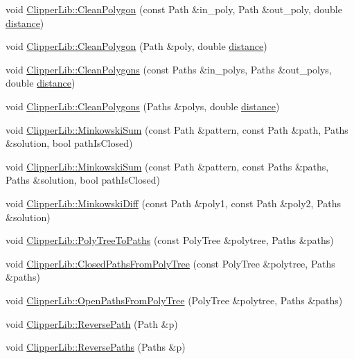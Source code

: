 \begin{DoxyCompactItemize}
\item 
void \mbox{\hyperlink{namespace_clipper_lib_a9246a3146ac112581e82be58e158be7b}{Clipper\+Lib\+::\+Clean\+Polygon}} (const Path \&in\+\_\+poly, Path \&out\+\_\+poly, double \mbox{\hyperlink{unwrapping_8cc_ac6bcc6db62057bda0b6195a11578fdfa}{distance}})
\item 
void \mbox{\hyperlink{namespace_clipper_lib_a819f3ac34feed7ca8c64c54bc534eb1b}{Clipper\+Lib\+::\+Clean\+Polygon}} (Path \&poly, double \mbox{\hyperlink{unwrapping_8cc_ac6bcc6db62057bda0b6195a11578fdfa}{distance}})
\item 
void \mbox{\hyperlink{namespace_clipper_lib_a770cbc6ce4f16d02b8fe27c5abf6159c}{Clipper\+Lib\+::\+Clean\+Polygons}} (const Paths \&in\+\_\+polys, Paths \&out\+\_\+polys, double \mbox{\hyperlink{unwrapping_8cc_ac6bcc6db62057bda0b6195a11578fdfa}{distance}})
\item 
void \mbox{\hyperlink{namespace_clipper_lib_aeee397f9f7e7cb5f0bb4723b7c4969e9}{Clipper\+Lib\+::\+Clean\+Polygons}} (Paths \&polys, double \mbox{\hyperlink{unwrapping_8cc_ac6bcc6db62057bda0b6195a11578fdfa}{distance}})
\item 
void \mbox{\hyperlink{namespace_clipper_lib_ad12b5697c25579dce65d369a2e3cf608}{Clipper\+Lib\+::\+Minkowski\+Sum}} (const Path \&pattern, const Path \&path, Paths \&solution, bool path\+Is\+Closed)
\item 
void \mbox{\hyperlink{namespace_clipper_lib_ae4893aa579fd7c46ce695fd3d1c66e64}{Clipper\+Lib\+::\+Minkowski\+Sum}} (const Path \&pattern, const Paths \&paths, Paths \&solution, bool path\+Is\+Closed)
\item 
void \mbox{\hyperlink{namespace_clipper_lib_a76dac24102863220c7bc13be222a1dda}{Clipper\+Lib\+::\+Minkowski\+Diff}} (const Path \&poly1, const Path \&poly2, Paths \&solution)
\item 
void \mbox{\hyperlink{namespace_clipper_lib_a3713b024b773e4e041f3de4595ff0f77}{Clipper\+Lib\+::\+Poly\+Tree\+To\+Paths}} (const Poly\+Tree \&polytree, Paths \&paths)
\item 
void \mbox{\hyperlink{namespace_clipper_lib_a83f3a341799f94dd6bd9649b319d85fa}{Clipper\+Lib\+::\+Closed\+Paths\+From\+Poly\+Tree}} (const Poly\+Tree \&polytree, Paths \&paths)
\item 
void \mbox{\hyperlink{namespace_clipper_lib_aa8b0b36c4c1e8108f39b10e4fba81cc5}{Clipper\+Lib\+::\+Open\+Paths\+From\+Poly\+Tree}} (Poly\+Tree \&polytree, Paths \&paths)
\item 
void \mbox{\hyperlink{namespace_clipper_lib_ab6376320953c60093dc73462c74589e1}{Clipper\+Lib\+::\+Reverse\+Path}} (Path \&p)
\item 
void \mbox{\hyperlink{namespace_clipper_lib_ade103cad7caf2aa357b2d5410866ea62}{Clipper\+Lib\+::\+Reverse\+Paths}} (Paths \&p)
\end{DoxyCompactItemize}
